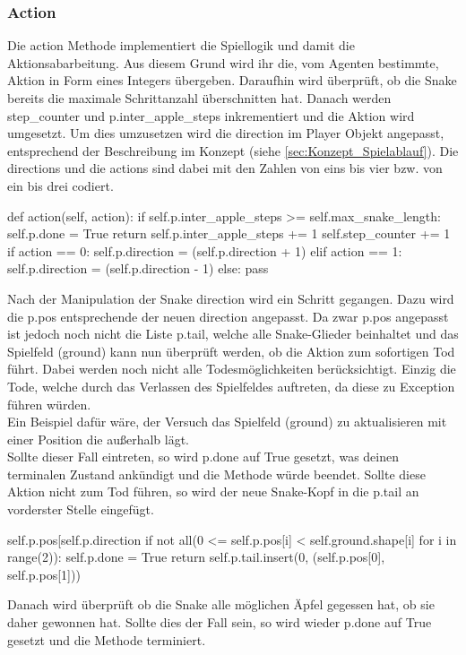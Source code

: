 \subsubsection{Action} \label{sec:Implementierung-Action}
Die action Methode implementiert die Spiellogik und damit die Aktionsabarbeitung. Aus diesem Grund wird ihr die, vom Agenten bestimmte, Aktion in Form eines Integers übergeben. Daraufhin wird überprüft, ob die Snake bereits die maximale Schrittanzahl überschnitten hat. Danach werden step\_counter und p.inter\_apple\_steps inkrementiert und die Aktion wird umgesetzt. Um dies umzusetzen wird die direction im Player Objekt angepasst, entsprechend der Beschreibung im Konzept (siehe \ref{sec:Konzept_Spielablauf}). Die directions und die actions sind dabei mit den Zahlen von eins bis vier bzw. von ein bis drei codiert.
\begin{python}
	def action(self, action):
		if self.p.inter_apple_steps >= self.max_snake_length:
			self.p.done = True
			return
		self.p.inter_apple_steps += 1
		self.step_counter += 1
		if action == 0:
			self.p.direction = (self.p.direction + 1) %
		elif action == 1:
			self.p.direction = (self.p.direction - 1) %
		else:
			pass
\end{python}
Nach der Manipulation der Snake direction wird ein Schritt gegangen. Dazu wird die p.pos entsprechende der neuen direction angepasst. Da zwar p.pos angepasst ist jedoch noch nicht die Liste p.tail, welche alle Snake-Glieder beinhaltet und das Spielfeld (ground) kann nun überprüft werden, ob die Aktion zum sofortigen Tod führt. Dabei werden noch nicht alle Todesmöglichkeiten berücksichtigt. Einzig die Tode, welche durch das Verlassen des Spielfeldes auftreten, da diese zu Exception führen würden.\\ 
Ein Beispiel dafür wäre, der Versuch das Spielfeld (ground) zu aktualisieren mit einer Position die außerhalb lägt.\\
Sollte dieser Fall eintreten, so wird p.done auf True gesetzt, was deinen terminalen Zustand ankündigt und die Methode würde beendet. Sollte diese Aktion nicht zum Tod führen, so wird der neue Snake-Kopf in die p.tail an vorderster Stelle eingefügt.
\begin{python}
	self.p.pos[self.p.direction %
	if not all(0 <= self.p.pos[i] < self.ground.shape[i] for i in range(2)):
		self.p.done = True
		return
	self.p.tail.insert(0, (self.p.pos[0], self.p.pos[1]))
\end{python}
Danach wird überprüft ob die Snake alle möglichen Äpfel gegessen hat, ob sie daher gewonnen hat. Sollte dies der Fall sein, so wird wieder p.done auf True gesetzt und die Methode terminiert.
